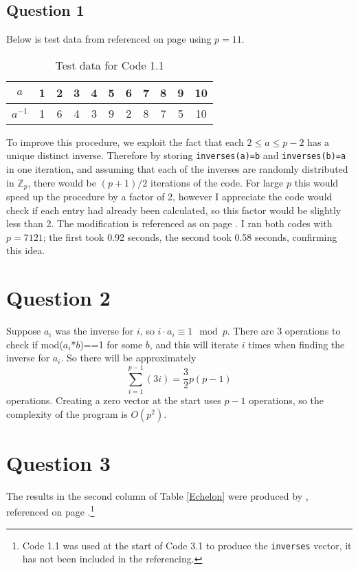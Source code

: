 \documentclass[10pt,a4paper,notitlepage]{article}
\author{Jonah Gibbon}
\newcommand{\Z}{\mathbb{Z}}
\begin{document}
\begin{large}
\section*{\centering \large Question 1}
\end{large}
Below is test data from  referenced on page \pageref{subsec:Code 1.1} using $p=11 $.
\begin{table}[H]
\begin{center}
\begin{tabular}{|c|cccccccccc|}
\hline 
$a$ & 1 & 2 & 3 & 4 & 5 & 6 & 7 & 8 & 9 & 10 \\ 
\hline 
$a^{-1}$ & 1 & 6 & 4 & 3 & 9 & 2 & 8 & 7 & 5 & 10 \\ 
\hline 
\end{tabular} 
\end{center}
\caption{Test data for Code 1.1}
\end{table}
To improve this procedure, we exploit the fact that each $2\leq a \leq p-2$ has a unique distinct inverse. Therefore by storing \texttt{inverses(a)=b} and \texttt{inverses(b)=a} in one iteration, and assuming that each of the inverses are randomly distributed in $\Z_{p}$, there would be $(p+1)/2$ iterations of the code.  For large $p$ this would speed up the procedure by a factor of 2, however I appreciate the code would check if each entry had already been calculated, so this factor would be slightly less than 2. The modification is referenced as  on page \pageref{subsec:Code 1.2}. I ran both codes with $p=7121$; the first took 0.92 seconds, the second took 0.58 seconds, confirming this idea.\\
\section*{\centering \large Question 2}
Suppose $a_{i}$ was the inverse for $i$, so $i\cdot a_{i}\equiv 1 \mod p$. There are 3 operations to check if mod($a_{i}$*$b$)==1 for some $b$, and this will iterate $i$ times when finding the inverse for $a_{i}$. So there will be approximately 
\begin{equation}
\sum_{i=1}^{p-1}\left(3i\right)=\frac{3}{2}p(p-1)
\end{equation}
operations. Creating a zero vector at the start uses $p-1$ operations, so the complexity of the program is $O(p^{2})$.\\
\section*{\centering \large Question 3}
The results in the second column of Table \ref{Echelon} were produced by , referenced on page \pageref{subsec:Code 3.1}.\footnote{Code 1.1 was used at the start of Code 3.1 to produce the \texttt{inverses} vector, it has not been included in the referencing.}
\end{document}
